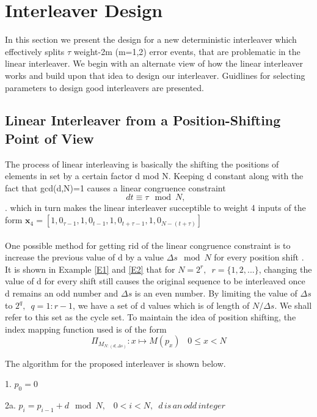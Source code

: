 \documentclass[20 pts]{article}
\begin{document}
\section{Interleaver Design}
\label{sec}
In this section we present the design for a new deterministic interleaver which 
effectively splits $\tau$ weight-2m (m={1,2}) error events, that are problematic
in the linear interleaver. We begin with an alternate view of how the linear interleaver
works and build upon that idea to design our interleaver. Guidlines for selecting
parameters to design good interleavers are presented.  
 \subsection{Linear Interleaver from a Position-Shifting Point of View}
 The process of linear interleaving is basically the shifting the positions of elements in
 set by a certain factor d mod N. 
 Keeping d constant along with the fact that gcd(d,N)=1 causes a linear congruence
  constraint 
 $$ dt \equiv \tau \mod N, \,\,\,\, $$. which in turn makes the
  linear interleaver succeptible to weight 4 inputs of the form 
  $\mathbf{x}_4=[1 ,0_{\tau-1},1,0_{t-1},1,0_{t+\tau-1},1,0_{N-(t+\tau)}]$
  \paragraph{}
  One possible method for getting rid of the linear congruence constraint is to increase
  the previous value of d by a value $\Delta s \mod N$  for every position shift . 
  It is shown in Example \ref{E1} and \ref{E2}
   that for $N=2^r,\,\,\, r=\{1,2,...\}$, changing the value of d for every shift still 
   causes
   the original sequence to be interleaved once d remains an odd number and $\Delta s$
   is an even number. By limiting the value of $\Delta s$ to $2^q,\,\,\, q=1:r-1$, we 
   have a set of d values which is of length of $N/\Delta s$. We shall refer to this 
   set as the cycle set. To maintain the idea of position shifting, the index mapping
   function used is of the form 
   $$\Pi_{\mathit{M}_{N:(d,\Delta s)}} : x \mapsto M(p_x)\,\,\,\,\, 0\leq x<N$$
  
  The algorithm for the proposed interleaver is shown below.
  
   1. $p_0=0$
 
 2a. $p_i=p_{i-1}+d \mod N,\,\,\,\,\, 0<i<N,\,\,\, \mathit{d \,is \,an \,odd \,integer}$
 
\end{document}
